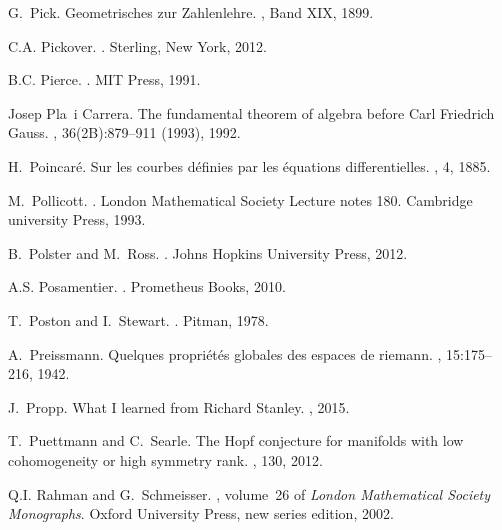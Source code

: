 \documentclass[12pt]{amsart}
\begin{document}
\begin{thebibliography}{100}
G.~Pick.
\newblock Geometrisches zur {Z}ahlenlehre.
, Band XIX, 1899.

C.A. Pickover.
.
\newblock Sterling, New York, 2012.

B.C. Pierce.
.
\newblock MIT Press, 1991.

Josep Pla~i Carrera.
\newblock The fundamental theorem of algebra before {C}arl {F}riedrich {G}auss.
, 36(2B):879--911 (1993), 1992.

H.~Poincar{\'e}.
\newblock Sur les courbes {d\'efinies} par les \'equations differentielles.
, 4, 1885.

M.~Pollicott.
.
\newblock London Mathematical Society Lecture notes 180. Cambridge university
  Press, 1993.

B.~Polster and M.~Ross.
.
\newblock Johns Hopkins University Press, 2012.

A.S. Posamentier.
.
\newblock Prometheus Books, 2010.

T.~Poston and I.~Stewart.
.
\newblock Pitman, 1978.

A.~Preissmann.
\newblock Quelques propri\'et\'es globales des espaces de riemann.
, 15:175--216, 1942.

J.~Propp.
\newblock What {I} learned from {R}ichard {S}tanley.
, 2015.

T.~Puettmann and C.~Searle.
\newblock The {H}opf conjecture for manifolds with low cohomogeneity or high
  symmetry rank.
, 130, 2012.

Q.I. Rahman and G.~Schmeisser.
, volume~26 of {\em London
  Mathematical Society Monographs}.
\newblock Oxford University Press, new series edition, 2002.


\end{thebibliography}
\end{document}
